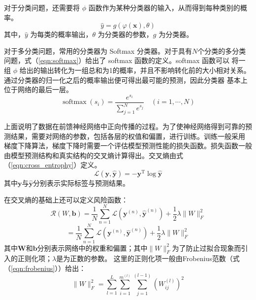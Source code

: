 对于分类问题，还需要将 $\phi$ 函数作为某种分类器的输入，从而得到每种类别的概率。
\begin{equation} 
\hat{y}=g(\varphi(\mathbf{x}), \theta)
\end{equation}
其中，$\hat{y}$ 为每类的概率输出，$\theta$ 为分类器的参数，$g$ 为分类器。

对于多分类问题，常用的分类器为 Softmax 分类器。对于具有$N$个分类的多分类问题，式（\ref{eqn:softmax}）给出了 softmax 函数的定义。softmax 函数可以
将一组 $\phi$ 给出的输出转化为一组总和为1的概率，并且不影响转化前的大小相对关系。通过分类器的归一化之后的概率输出便可得出最可能的预测，因此分类器
基本上位于网络的最后一层。
\begin{equation} 
\label{eqn:softmax}
\operatorname{softmax}\left(s_{i}\right)=\frac{e^{s_{i}}}{\sum_{j=1}^{N} e^{s_{j}}} \quad(i=1, \cdots, N)
\end{equation}

上面说明了数据在前馈神经网络中正向传播的过程。为了使神经网络得到可靠的预测结果，需要对网络的参数，包括各层的权值和偏置，进行训练。训练一般采用
梯度下降算法，梯度下降时需要一个评估模型预测性能的损失函数。损失函数一般由模型预测结构和真实结构的交叉熵计算得出。交叉熵由式（\ref{eqn:cross_entrophy}）定义。
\begin{equation}
\label{eqn:cross_entrophy} 
\mathcal{L}(\mathbf{y}, \hat{\mathbf{y}})=-\mathbf{y}^{\mathrm{T}} \log \hat{\mathbf{y}}
 \end{equation}
其中$\mathbf{y}$与$\hat{\mathbf{y}}$分别表示实际标签与预测结果。

在交叉熵的基础上还可以定义风险函数：
\begin{equation} 
\mathcal{R}(W, \mathbf{b})=\frac{1}{N} \sum_{n=1}^{N} \mathcal{L}\left(\mathbf{y}^{(n)}, \hat{\mathbf{y}}^{(n)}\right)+\frac{1}{2} \lambda\|W\|_{F}^{2}
\end{equation}
\begin{equation} 
=\frac{1}{N} \sum_{n=1}^{N} \mathcal{L}\left(\mathbf{y}^{(n)}, \hat{\mathbf{y}}^{(n)}\right)+\frac{1}{2} \lambda\|W\|_{F}^{2}
\end{equation}
其中$\mathbf{W}$和$\mathbf{b}$分别表示网络中的权重和偏置；其中$\|W\|_{F}^{2}$为了防止过拟合现象而引入的正则化项；$\lambda$是为正数的参数。
这里的正则化项一般由Frobenius范数（式（\ref{eqn:frobenius}））给出：
\begin{equation} 
\label{eqn:frobenius}
\|W\|_{F}^{2}=\sum_{l=1}^{L} \sum_{i=1}^{m^{(l)}} \sum_{j=1}^{(l-1)}\left(W_{i j}^{(l)}\right)^{2}
\end{equation}

